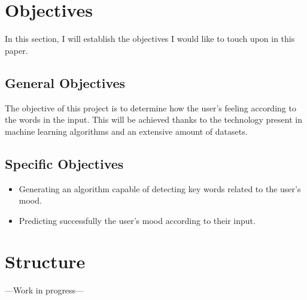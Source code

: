 \section{Objectives}
In this section, I will establish the objectives I would like to touch upon in this paper.

\subsection{General Objectives}
The objective of this project is to determine how the user's feeling according to the words in the input. This will be achieved thanks to the technology present in machine learning algorithms and an extensive amount of datasets.

\subsection{Specific Objectives}
\begin{itemize}
	\item Generating an algorithm capable of detecting key words related to the user's mood.
	\item Predicting successfully the user's mood according to their input.
\end{itemize}

\section{Structure}
---Work in progress---
\clearpage